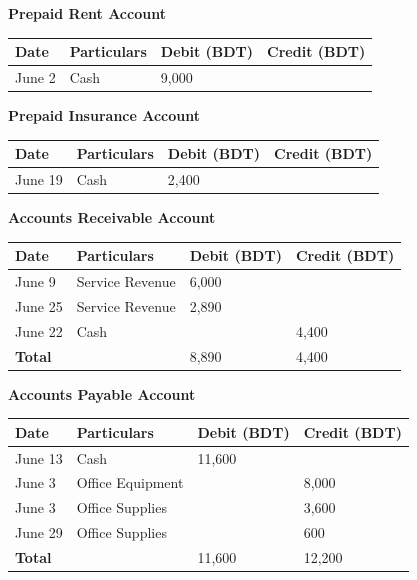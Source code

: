 \documentclass[12pt,a4paper]{book}
\begin{document}
\vspace{0.5cm}

\begin{center}
\textbf{Prepaid Rent Account}\\
\begin{tabular}{|p{2cm}|p{8cm}|p{2.5cm}|p{2.7cm}|}
\hline
\textbf{Date} & \textbf{Particulars} & \textbf{Debit (BDT)} & \textbf{Credit (BDT)} \\
\hline
June 2 & Cash & 9,000 & \\
\hline
\end{tabular}
\end{center}

\vspace{0.5cm}

\begin{center}
\textbf{Prepaid Insurance Account}\\
\begin{tabular}{|p{2cm}|p{8cm}|p{2.5cm}|p{2.7cm}|}
\hline
\textbf{Date} & \textbf{Particulars} & \textbf{Debit (BDT)} & \textbf{Credit (BDT)} \\
\hline
June 19 & Cash & 2,400 & \\
\hline
\end{tabular}
\end{center}

\vspace{0.5cm}

\begin{center}
\textbf{Accounts Receivable Account}\\
\begin{tabular}{|p{2cm}|p{8cm}|p{2.5cm}|p{2.7cm}|}
\hline
\textbf{Date} & \textbf{Particulars} & \textbf{Debit (BDT)} & \textbf{Credit (BDT)} \\
\hline
June 9 & Service Revenue & 6,000 & \\
June 25 & Service Revenue & 2,890 & \\
June 22 & Cash & & 4,400 \\
\hline
\textbf{Total} & & 8,890 & 4,400 \\
\hline
\end{tabular}
\end{center}

\vspace{0.5cm}

\begin{center}
\textbf{Accounts Payable Account}\\
\begin{tabular}{|p{2cm}|p{8cm}|p{2.5cm}|p{2.7cm}|}
\hline
\textbf{Date} & \textbf{Particulars} & \textbf{Debit (BDT)} & \textbf{Credit (BDT)} \\
\hline
June 13 & Cash & 11,600 & \\
June 3 & Office Equipment & & 8,000 \\
June 3 & Office Supplies & & 3,600 \\
June 29 & Office Supplies & & 600 \\
\hline
\textbf{Total} & & 11,600 & 12,200 \\
\hline
\end{tabular}
\end{center}
\end{document}
